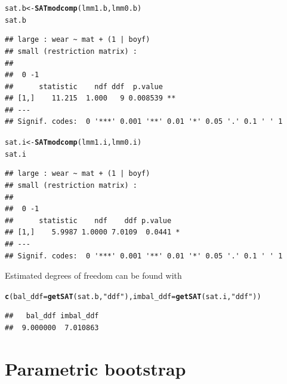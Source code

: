 \documentclass[11pt]{article}\usepackage[]{graphicx}\usepackage[]{xcolor}
\makeatletter
\newcommand{\hlstr}[1]{\textcolor[rgb]{0.192,0.494,0.8}{#1}}%
\newcommand{\hlstd}[1]{\textcolor[rgb]{0.345,0.345,0.345}{#1}}%
\newcommand{\hlkwb}[1]{\textcolor[rgb]{0.69,0.353,0.396}{#1}}%
\newcommand{\hlkwc}[1]{\textcolor[rgb]{0.333,0.667,0.333}{#1}}%
\newcommand{\hlkwd}[1]{\textcolor[rgb]{0.737,0.353,0.396}{\textbf{#1}}}%
\newenvironment{kframe}{%
 \def\at@end@of@kframe{}%
 \ifinner\ifhmode%
  \def\at@end@of@kframe{\end{minipage}}%
  \begin{minipage}{\columnwidth}%
 \fi\fi%
 \def\FrameCommand##1{\hskip\@totalleftmargin \hskip-\fboxsep
 \colorbox{shadecolor}{##1}\hskip-\fboxsep
     \hskip-\linewidth \hskip-\@totalleftmargin \hskip\columnwidth}%
 \MakeFramed {\advance\hsize-\width
   \@totalleftmargin\z@ \linewidth\hsize
   \@setminipage}}%
 {\par\unskip\endMakeFramed%
 \at@end@of@kframe}
\newenvironment{knitrout}{}{} %
\makeatother
\begin{document}
\begin{knitrout}
\color{fgcolor}\begin{kframe}
\begin{alltt}
\hlstd{sat.b} \hlkwb{<-} \hlkwd{SATmodcomp}\hlstd{(lmm1.b, lmm0.b)}
\hlstd{sat.b}
\end{alltt}
\begin{verbatim}
## large : wear ~ mat + (1 | boyf)
## small (restriction matrix) : 
##      
##  0 -1
##      statistic    ndf ddf  p.value   
## [1,]    11.215  1.000   9 0.008539 **
## ---
## Signif. codes:  0 '***' 0.001 '**' 0.01 '*' 0.05 '.' 0.1 ' ' 1
\end{verbatim}
\end{kframe}
\end{knitrout}

\begin{knitrout}
\color{fgcolor}\begin{kframe}
\begin{alltt}
\hlstd{sat.i} \hlkwb{<-} \hlkwd{SATmodcomp}\hlstd{(lmm1.i, lmm0.i)}
\hlstd{sat.i}
\end{alltt}
\begin{verbatim}
## large : wear ~ mat + (1 | boyf)
## small (restriction matrix) : 
##      
##  0 -1
##      statistic    ndf    ddf p.value  
## [1,]    5.9987 1.0000 7.0109  0.0441 *
## ---
## Signif. codes:  0 '***' 0.001 '**' 0.01 '*' 0.05 '.' 0.1 ' ' 1
\end{verbatim}
\end{kframe}
\end{knitrout}

Estimated degrees of freedom can be found with

\begin{knitrout}
\color{fgcolor}\begin{kframe}
\begin{alltt}
\hlkwd{c}\hlstd{(}\hlkwc{bal_ddf} \hlstd{=} \hlkwd{getSAT}\hlstd{(sat.b,} \hlstr{"ddf"}\hlstd{),} \hlkwc{imbal_ddf} \hlstd{=} \hlkwd{getSAT}\hlstd{(sat.i,} \hlstr{"ddf"}\hlstd{))}
\end{alltt}
\begin{verbatim}
##   bal_ddf imbal_ddf 
##  9.000000  7.010863
\end{verbatim}
\end{kframe}
\end{knitrout}


\section{Parametric bootstrap}
\label{sec:parametric-bootstrap}
\end{document}
